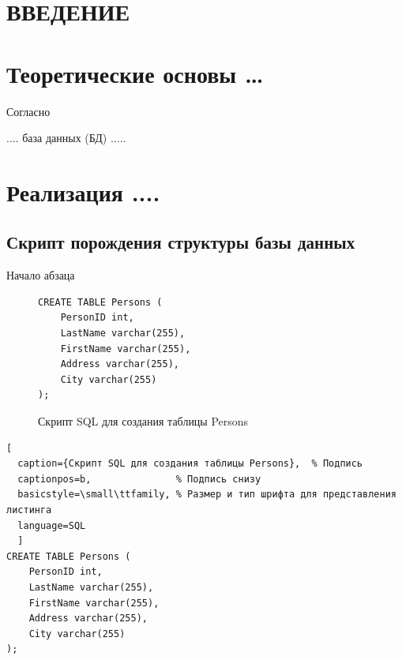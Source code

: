 \documentclass{studrep}
\begin{document}
\tableofcontents

\chapter*{ВВЕДЕНИЕ}
\label{chap:intro}

\chapter{Теоретические основы \ldots}

Согласно \cite{bratko90}

.... база данных (БД) .....

\chapter{Реализация ....}

\section{Скрипт порождения структуры базы данных}
\label{sec:struct-bd}

Начало абзаца


\begin{figure}[htbp]
\begin{center}
\begin{verbatim}
CREATE TABLE Persons (
    PersonID int,
    LastName varchar(255),
    FirstName varchar(255),
    Address varchar(255),
    City varchar(255)
);
\end{verbatim}
\end{center}
\caption{Скрипт SQL для создания таблицы Persons}\label{fig:create-table}
\end{figure}

\begin{lstlisting}[
  caption={Скрипт SQL для создания таблицы Persons},  % Подпись
  captionpos=b,               % Подпись снизу
  basicstyle=\small\ttfamily, % Размер и тип шрифта для представления листинга
  language=SQL
  ]
CREATE TABLE Persons (
    PersonID int,
    LastName varchar(255),
    FirstName varchar(255),
    Address varchar(255),
    City varchar(255)
);
\end{lstlisting}
\end{document}
